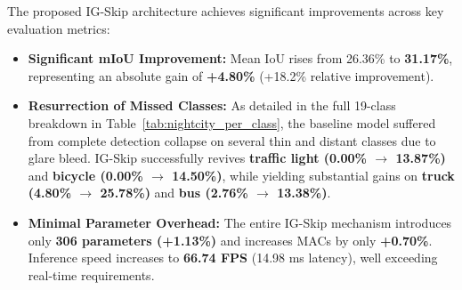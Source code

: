 \documentclass[conference]{IEEEtran}
\begin{document}
\begin{table}[t]
\caption{Overall Performance and Complexity on NightCity Validation Split (300 Epochs, Tesla T4 GPU).}
\label{tab:nightcity_overall}
\centering
{}
\end{table}

The proposed IG-Skip architecture achieves significant improvements across key evaluation metrics:
\begin{itemize}
    \item \textbf{Significant mIoU Improvement:} Mean IoU rises from 26.36\% to \textbf{31.17\%}, representing an absolute gain of \textbf{+4.80\%} (+18.2\% relative improvement).
    \item \textbf{Resurrection of Missed Classes:} As detailed in the full 19-class breakdown in Table~\ref{tab:nightcity_per_class}, the baseline model suffered from complete detection collapse on several thin and distant classes due to glare bleed. IG-Skip successfully revives \textbf{traffic light (0.00\% $\rightarrow$ 13.87\%)} and \textbf{bicycle (0.00\% $\rightarrow$ 14.50\%)}, while yielding substantial gains on \textbf{truck (4.80\% $\rightarrow$ 25.78\%)} and \textbf{bus (2.76\% $\rightarrow$ 13.38\%)}.
    \item \textbf{Minimal Parameter Overhead:} The entire IG-Skip mechanism introduces only \textbf{306 parameters (+1.13\%)} and increases MACs by only \textbf{+0.70\%}. Inference speed increases to \textbf{66.74 FPS} (14.98 ms latency), well exceeding real-time requirements.
\end{itemize}
\end{document}
